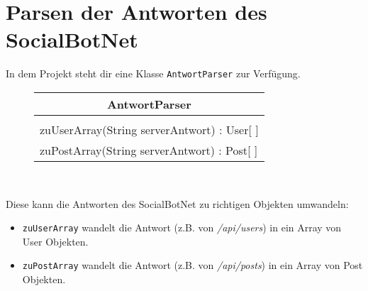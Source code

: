 \documentclass[parskip=half*]{scrartcl}
\begin{document}
\section*{Parsen der Antworten des SocialBotNet}
In dem Projekt steht dir eine Klasse \lstinline{AntwortParser} zur Verfügung.
\begin{figure}[htb]
    \centering
    \begin{tabular}[t]{|l|}
    \hline
    \multicolumn{1}{|c|}{\bfseries AntwortParser} \\ \hline
                    \\ \hline
    zuUserArray(String serverAntwort) : User[ ] \\
    zuPostArray(String serverAntwort) : Post[ ] \\ \hline
    \end{tabular} \\ \vspace{0.1cm}
    \label{fig:klasse_AntwortParser}
\end{figure}

Diese kann die Antworten des SocialBotNet zu richtigen Objekten umwandeln:
\begin{itemize}
\item \lstinline{zuUserArray} wandelt die Antwort (z.B. von \emph{/api/users}) in ein Array von User Objekten.
\item \lstinline{zuPostArray} wandelt die Antwort (z.B. von \emph{/api/posts}) in ein Array von Post Objekten.
\end{itemize}
\end{document}
